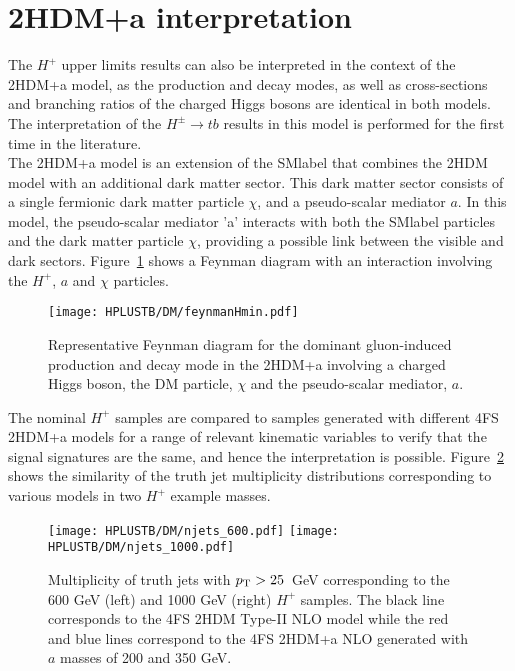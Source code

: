 \section{2HDM+a interpretation}

The $H^+$ upper limits results can also be interpreted in the context of the 2HDM+a model, as the production and decay modes, as well as cross-sections and branching ratios of the charged Higgs bosons are identical in both models. The interpretation of the $H^\pm\to tb$ results in this model is performed for the first time in the literature.\\

The 2HDM+a model is an extension of the \acrshort{SMlabel} that combines the 2HDM model with an additional dark matter sector. This dark matter sector consists of a single fermionic dark matter particle $\chi$, and a pseudo-scalar mediator $a$. In this model, the pseudo-scalar mediator 'a' interacts with both the \acrshort{SMlabel} particles and the dark matter particle $\chi$, providing a possible link between the visible and dark sectors. Figure~\ref{Hplustb:2hdmafeynman} shows a Feynman diagram with an interaction involving the $H^+$, $a$ and $\chi$ particles.\\

\begin{figure}[htb]
    \RawFloats
    \centering
    \texttt{[image: HPLUSTB/DM/feynmanHmin.pdf]}
    \caption{Representative Feynman diagram for the dominant gluon-induced production and decay mode in the 2HDM+a involving a charged Higgs boson, the DM particle, $\chi$ and the pseudo-scalar mediator, $a$.}
    \label{Hplustb:2hdmafeynman}
\end{figure}

The nominal $H^+$ samples are compared to samples generated with different 4FS 2HDM+a models for a range of relevant kinematic variables to verify that the signal signatures are the same, and hence the interpretation is possible. Figure~\ref{Hplustb:2hdmatruth} shows the similarity of the truth jet multiplicity distributions corresponding to various models in two $H^+$ example masses.\\

\begin{figure}[htb]
    \RawFloats
    \centering
    \texttt{[image: HPLUSTB/DM/njets\_600.pdf]}
    \texttt{[image: HPLUSTB/DM/njets\_1000.pdf]}
    \caption{Multiplicity of truth jets with $p_{\text{T}}>25$~GeV corresponding to the 600 GeV (left) and 1000 GeV (right) $H^+$ samples. The black line corresponds to the 4FS 2HDM Type-II NLO model while the red and blue lines correspond to the 4FS 2HDM+a NLO generated with $a$ masses of 200 and 350 GeV.}
    \label{Hplustb:2hdmatruth}
\end{figure}

